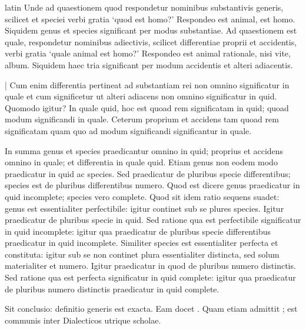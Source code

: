 \begin{otherlanguage*}{latin}
\pstart
Unde ad quaestionem quod respondetur nominibus substantivis generis, scilicet et speciei verbi gratia `quod est homo?' Respondeo est animal, est homo. Siquidem genus et species significant per modus substantiae. Ad quaestionem est quale, respondetur nominibus adiectivis, scilicet differentiae proprii et accidentis, verbi gratia `quale animal est homo?' Respondeo est animal rationale, nisi vite, album. Siquidem haec tria significant per modum accidentis et alteri adiacentis. 
\pend

\pstart
\textnormal{|} Cum enim differentia pertineat ad substantiam rei non omnino significatur in quale et cum significetur ut alteri adiacens non omnino significatur in quid. Quomodo igitur? In quale quid, hoc est quoad rem significatam in quid; quoad modum significandi in quale. Ceterum proprium et accidens tam quoad rem significatam quam quo ad modum significandi significantur in quale. 
\pend

\pstart
In summa genus et species praedicantur omnino in quid; proprius et accidens omnino in quale; et differentia in quale quid. Etiam genus non eodem modo praedicatur in quid ac species. Sed praedicatur de pluribus specie differentibus; species est de pluribus differentibus numero. Quod est dicere genus praedicatur in quid incomplete; species vero complete. Quod sit idem ratio sequens suadet:
genus est essentialiter perfectibile:
igitur continet sub se plures species. Igitur praedicatur de pluribus specie in quid. Sed ratione qua est perfectibile significatur in quid incomplete:
igitur qua praedicatur de pluribus specie differentibus praedicatur in quid incomplete. Similiter species est essentialiter perfecta et constituta:
igitur sub se non continet plura essentialiter distincta, sed solum materialiter et numero. Igitur praedicatur in quod de pluribus numero distinctis. Sed ratione qua est perfecta significatur in quid complete:
igitur qua praedicatur de pluribus numero distinctis praedicatur in quid complete. 
\pend

\pstart
Sit conclusio:
definitio generis est exacta. Eam docet . Quam etiam admittit ; est communis inter Dialecticos utrique scholae. 
\pend


\end{otherlanguage*}
